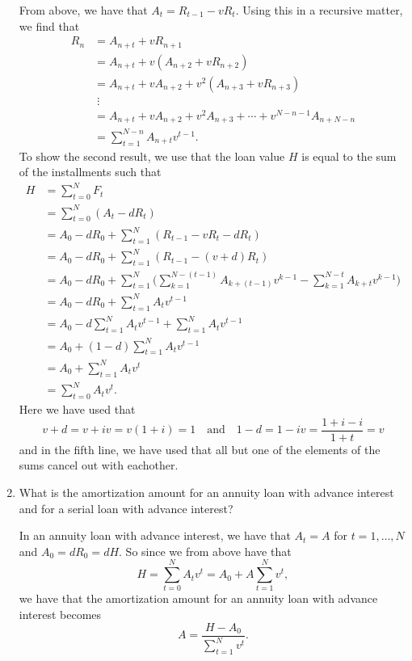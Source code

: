 \documentclass[a4paper,colorinlistoftodos, 10pt]{article}
\begin{document}
\begin{enumerate}
From above, we have that $A_t=R_{t-1} - vR_t$. Using this in a recursive matter, we find that
\begin{align*}
R_n & = A_{n+t} + vR_{n+1} \\
& = A_{n+t} + v(A_{n+2} + vR_{n+2}) \\
& = A_{n+t} + vA_{n+2} + v^2(A_{n+3} + vR_{n+3}) \\
& \; \vdots \\
& = A_{n+t} + vA_{n+2} + v^2A_{n+3} + \cdots + v^{N-n-1}A_{n+N-n} \\
& = \sum_{t=1}^{N-n} A_{n+t}v^{t-1}.
\end{align*}
To show the second result, we use that the loan value $H$ is equal to the sum of the installments such that 
\begin{align*}
H & = \sum_{t=0}^N F_t \\
& = \sum_{t=0}^N (A_t - dR_t) \\
& = A_0 - dR_0 + \sum_{t=1}^N (R_{t-1} - vR_t - dR_t) \\
& = A_0 - dR_0 + \sum_{t=1}^N (R_{t-1} - (v + d)R_t) \\
& = A_0 - dR_0 + \sum_{t=1}^N \Big(
    \sum_{k=1}^{N-(t-1)} A_{k+(t-1)} v^{k-1} - 
    \sum_{k=1}^{N-t} A_{k+t} v^{k-1}
    \Big) \\
& = A_0 - dR_0 + \sum_{t=1}^N A_t v^{t-1} \\
& = A_0 - d\sum_{t=1}^N A_t v^{t-1} + \sum_{t=1}^N A_t v^{t-1} \\
& = A_0 + (1-d)\sum_{t=1}^N A_t v^{t-1} \\
& = A_0 + \sum_{t=1}^N A_t v^t \\
& = \sum_{t=0}^N A_t v^t.
\end{align*}
Here we have used that 
\begin{equation*}
v + d = v + iv = v(1+i) = 1\quad\text{and}\quad 1-d = 1-iv = \frac{1+i-i}{1+t} = v
\end{equation*}
and in the fifth line, we have used that all but one of the elements of the sums cancel out with eachother.

\item What is the amortization amount for an annuity loan with advance interest and for a serial loan with advance interest?

In an annuity loan with advance interest, we have that $A_t = A$ for $t=1,\dots,N$ and $A_0 = dR_0 = dH$. So since we from above have that 
\begin{equation*}
H = \sum_{t=0}^N A_tv^t = A_0 + A\sum_{t=1}^N v^t,
\end{equation*}
we have that the amortization amount for an annuity loan with advance interest becomes
\begin{equation*}
A = \frac{H - A_0}{\sum_{t=1}^N v^t}.
\end{equation*}


\end{enumerate}
\end{document}
